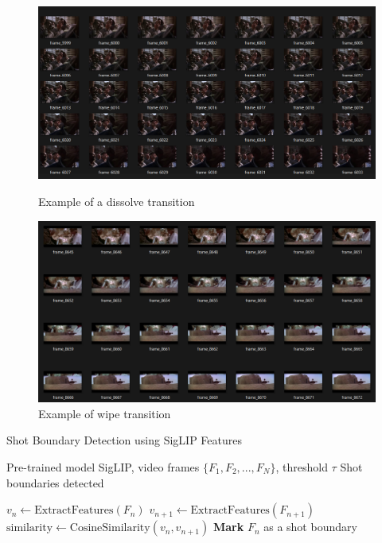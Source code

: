 \documentclass[12pt]{report}
\begin{document}
	\begin{figure}[h]
		\centering
		\begin{minipage}{0.45\linewidth}
			\centering
			\includegraphics[width=\linewidth]{example_dissolve_transition.png}
			\caption{Example of a dissolve transition}
			\label{fig:dissolve}
		\end{minipage}
		\hspace{0.05\linewidth}  %
		\begin{minipage}{0.45\linewidth}
			\centering
			\includegraphics[width=\linewidth]{example_wipe_transition.png}
			\caption{Example of wipe transition}
			\label{fig:wipe}
		\end{minipage}
	\end{figure}
	
	
	\begin{algorithm}
		\caption{Shot Boundary Detection using SigLIP Features}
		\label{alg:shot-detection}
		\begin{algorithmic}[1]
			\Require Pre-trained model SigLIP, video frames $\{F_1, F_2, ..., F_N\}$, threshold $\tau$
			\Ensure Shot boundaries detected
			
			 
			\State $v_n \gets \text{ExtractFeatures}(F_n)$  
			\State $v_{n+1} \gets \text{ExtractFeatures}(F_{n+1})$  
			\State $\text{similarity} \gets \text{CosineSimilarity}(v_n, v_{n+1})$
			\State \textbf{Mark} $F_n$ as a shot boundary
			\EndIf
			\EndFor
		\end{algorithmic}
	\end{algorithm}
	
\end{document}
